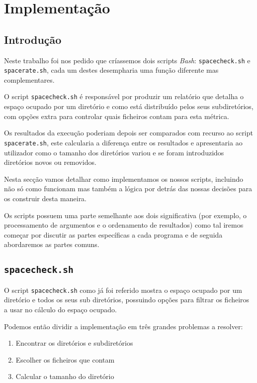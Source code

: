 \chapter{Implementação}

\section{Introdução}

Neste trabalho foi nos pedido que críassemos dois scripts \emph{Bash}:
\Verb|spacecheck.sh| e \Verb|spacerate.sh|, cada um destes desempharia uma
função diferente mas complementares.

O script \Verb|spacecheck.sh| é responsável por produzir um relatório que
detalha o espaço ocupado por um diretório e como está distribuído pelos seus
subdiretórios, com opções extra para controlar quais ficheiros contam para esta
métrica.

Os resultados da execução poderiam depois ser comparados com recurso ao script
\Verb|spacerate.sh|, este calcularia a diferença entre os resultados e
apresentaria ao utilizador como o tamanho dos diretórios variou e se foram
introduzidos diretórios novos ou removidos.

Nesta secção vamos detalhar como implementamos os nossos scripts, incluindo não
só como funcionam mas também a lógica por detrás das nossas decisões para os
construir desta maneira.

Os scripts possuem uma parte semelhante aos dois significativa (por exemplo, o
processamento de argumentos e o ordenamento de resultados) como tal iremos
começar por discutir as partes específicas a cada programa e de seguida
abordaremos as partes comuns.

\cprotect\section{\Verb|spacecheck.sh|}

O script \Verb|spacecheck.sh| como já foi referido mostra o espaço ocupado por
um diretório e todos os seus sub diretórios, possuindo opções para filtrar os
ficheiros a usar no cálculo do espaço ocupado.

Podemos então dividir a implementação em três grandes problemas a resolver:

\begin{enumerate}
	\item Encontrar os diretórios e subdiretórios
	\item Escolher os ficheiros que contam
	\item Calcular o tamanho do diretório
\end{enumerate}

